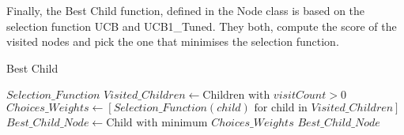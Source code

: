 Finally, the Best Child function, defined in the Node class is based on the selection function UCB and UCB1\_Tuned. They both, compute the score of the visited nodes and pick the one that minimises the selection function.

\begin{algorithm}[H]
    \caption{Best Child}
    \label{alg:Best Child}
    \begin{algorithmic}[1]
        \REQUIRE $Selection\_Function$
        \STATE $Visited\_Children \leftarrow \text{Children with } visitCount > 0$
        \STATE $Choices\_Weights \leftarrow \left[ Selection\_Function(child) \text{ for child in } Visited\_Children \right]$
        \STATE $Best\_Child\_Node \leftarrow \text{Child with minimum } Choices\_Weights$
        \RETURN $Best\_Child\_Node$
    \end{algorithmic}
\end{algorithm}